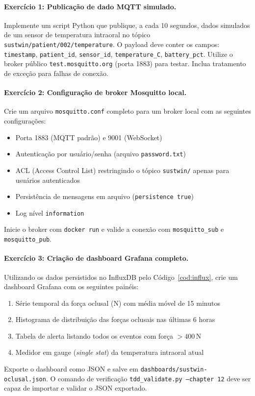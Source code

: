 \paragraph{Exercício 1: Publicação de dado MQTT simulado.}
Implemente um script Python que publique, a cada 10 segundos, dados simulados de um sensor de temperatura intraoral no tópico \texttt{sustwin/patient/002/temperature}. O payload deve conter os campos: \texttt{timestamp}, \texttt{patient\_id}, \texttt{sensor\_id}, \texttt{temperature\_C}, \texttt{battery\_pct}. Utilize o broker público \texttt{test.mosquitto.org} (porta 1883) para testar. Inclua tratamento de exceção para falhas de conexão.

\paragraph{Exercício 2: Configuração de broker Mosquitto local.}
Crie um arquivo \texttt{mosquitto.conf} completo para um broker local com as seguintes configurações:
\begin{itemize}
    \item Porta 1883 (MQTT padrão) e 9001 (WebSocket)
    \item Autenticação por usuário/senha (arquivo \texttt{password.txt})
    \item ACL (Access Control List) restringindo o tópico \texttt{sustwin/} apenas para usuários autenticados
    \item Persistência de mensagens em arquivo (\texttt{persistence true})
    \item Log nível \texttt{information}
\end{itemize}
Inicie o broker com \texttt{docker run} e valide a conexão com \texttt{mosquitto\_sub} e \texttt{mosquitto\_pub}.

\paragraph{Exercício 3: Criação de dashboard Grafana completo.}
Utilizando os dados persistidos no InfluxDB pelo Código~\ref{cod:influx}, crie um dashboard Grafana com os seguintes painéis:
\begin{enumerate}
    \item Série temporal da força oclusal (N) com média móvel de 15 minutos
    \item Histograma de distribuição das forças oclusais nas últimas 6 horas
    \item Tabela de alerta listando todos os eventos com força $>400$\,N
    \item Medidor em gauge (\textit{single stat}) da temperatura intraoral atual
\end{enumerate}
Exporte o dashboard como JSON e salve em \texttt{dashboards/sustwin-oclusal.json}. O comando de verificação \texttt{tdd\_validate.py --chapter 12} deve ser capaz de importar e validar o JSON exportado.
